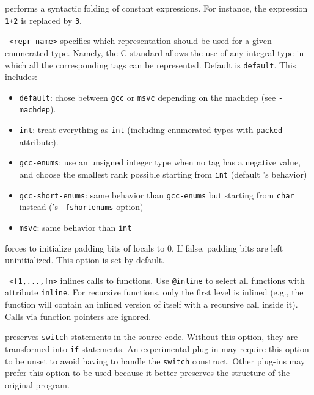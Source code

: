 \begin{description}
\item {} performs a syntactic folding of
constant expressions. For instance,
the expression \texttt{1+2} is replaced by \texttt{3}.

\item \texttt{ <repr name>} specifies which representation
should be used for a given enumerated type. Namely, the C standard allows the use
of any integral type in which all the corresponding tags can be represented.
Default is \texttt{default}.
This includes:
\begin{itemize}
\item \texttt{default}: chose between \texttt{gcc} or \texttt{msvc} depending on
the machdep (see \texttt{-machdep}).
\item \texttt{int}: treat everything as \texttt{int} (including enumerated types
with \texttt{packed} attribute).
\item \texttt{gcc-enums}: use an unsigned integer type when no tag has a
negative value, and choose the smallest rank possible starting from \texttt{int}
(default \gcc's behavior)
\item \texttt{gcc-short-enums}: same behavior than \texttt{gcc-enums} but
starting from \texttt{char} instead (\gcc's \texttt{-fshortenums} option)
\item \texttt{msvc}: same behavior than \texttt{int}
\end{itemize}

\item {} forces to initialize padding
  bits of locals to 0. If false, padding bits are left uninitialized. This
  option is set by default.

\item \texttt{ <f1,...,fn>} inlines calls to
  functions. Use \texttt{@inline} to select all functions with attribute
  \texttt{inline}.
  For recursive functions, only the first level
  is inlined (e.g., the function will contain an inlined version of itself with
  a recursive call inside it). Calls via function pointers are ignored.

\item {} preserves \texttt{switch} statements in the
  source code. Without this option, they are transformed into \texttt{if}
  statements. An experimental plug-in may require this option to be unset
  to avoid having to handle the \texttt{switch} construct.
  Other plug-ins may prefer this option to be used because it better
  preserves the structure of the original program.


\end{description}
